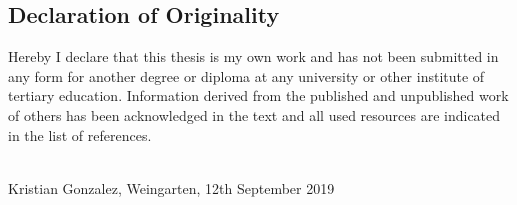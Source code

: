 \subsection*{Declaration of Originality}
Hereby I declare that this thesis is my own work and has not been submitted in any form for another degree or diploma at any university or other institute of tertiary education. Information derived from the published and unpublished work of others has been acknowledged in the text and all used resources are indicated in the list of references.

\vspace{1cm}

\underline{\hspace{5cm}}\\

Kristian Gonzalez, Weingarten, 12th September 2019
